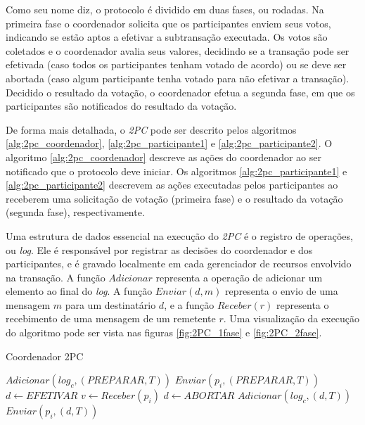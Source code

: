 \documentclass[11pt,twoside,a4paper]{book}
\begin{document}
Como seu nome diz, o protocolo é dividido em duas fases, ou rodadas. Na primeira fase o coordenador solicita que os participantes enviem seus votos, indicando se estão aptos a efetivar a subtransação executada. Os votos são coletados e o coordenador avalia seus valores, decidindo se a transação pode ser efetivada (caso todos os participantes tenham votado de acordo) ou se deve ser abortada (caso algum participante tenha votado para não efetivar a transação). Decidido o resultado da votação, o coordenador efetua a segunda fase, em que os participantes são notificados do resultado da votação. 


De forma mais detalhada, o \emph{2PC} pode ser descrito pelos algoritmos \ref{alg:2pc_coordenador}, \ref{alg:2pc_participante1} e \ref{alg:2pc_participante2}. O algoritmo \ref{alg:2pc_coordenador} descreve as ações do coordenador ao ser notificado que o protocolo deve iniciar. Os algoritmos \ref{alg:2pc_participante1} e \ref{alg:2pc_participante2} descrevem as ações executadas pelos participantes ao receberem uma solicitação de votação (primeira fase) e o resultado da votação (segunda fase), respectivamente. 

Uma estrutura de dados essencial na execução do \emph{2PC} é o registro de operações, ou \emph{log}. Ele é responsável por registrar as decisões do coordenador e dos participantes, e é gravado localmente em cada gerenciador de recursos envolvido na transação. A função $Adicionar$ representa a operação de adicionar um elemento ao final do \emph{log}. A função $Enviar(d, m)$ representa o envio de uma mensagem $m$ para um destinatário $d$, e a função $Receber(r)$ representa o recebimento de uma mensagem de um remetente $r$. Uma visualização da execução do algoritmo pode ser vista nas figuras \ref{fig:2PC_1fase} e \ref{fig:2PC_2fase}.

\begin{algorithm}
\caption{Coordenador 2PC}
\label{alg:2pc_coordenador}
\begin{algorithmic}[1]
\State $Adicionar(log_c, (PREPARAR, T))$
	\State $Enviar(p_i, (PREPARAR, T))$
\EndFor
\State $d \gets EFETIVAR$
	\State $v \gets Receber(p_i)$
		\State $d \gets ABORTAR$
	\EndIf
\EndFor
\State $Adicionar(log_c, (d, T))$
	\State $Enviar(p_i, (d, T))$
\EndFor
\end{algorithmic}
\end{algorithm}
\end{document}
